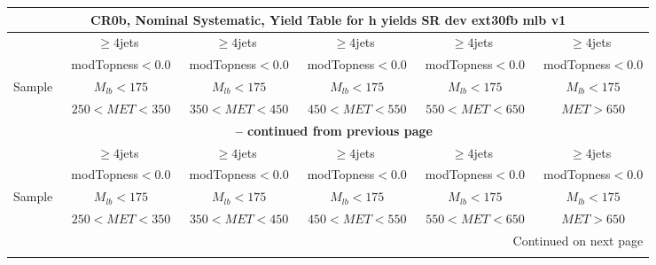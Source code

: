 \documentclass{article}
\begin{document}
 
 
 
 
\pagebreak 

 
 
 
 
\begin{longtable}{|l|c|c|c|c|c|} 
 
\multicolumn{6}{c}{ CR0b, Nominal Systematic, Yield Table for h yields SR dev ext30fb mlb v1 }\\* \hline 
  & $\ge4$jets  & $\ge4$jets  & $\ge4$jets  & $\ge4$jets  & $\ge4$jets \\* 
  & ~modTopness$<0.0$  & ~modTopness$<0.0$  & ~modTopness$<0.0$  & ~modTopness$<0.0$  & ~modTopness$<0.0$ \\* 
Sample  & ~$M_{lb}<175$  & ~$M_{lb}<175$  & ~$M_{lb}<175$  & ~$M_{lb}<175$  & ~$M_{lb}<175$ \\* 
  & ~$250<MET<350$  & ~$350<MET<450$  & ~$450<MET<550$  & ~$550<MET<650$  & ~$MET>650$ \\* 
\hline \hline 
\endfirsthead 
 
\multicolumn{6}{c}{{\bfseries \tablename\ \thetable{} -- continued from previous page}}\\* \hline 
  & $\ge4$jets  & $\ge4$jets  & $\ge4$jets  & $\ge4$jets  & $\ge4$jets \\* 
  & ~modTopness$<0.0$  & ~modTopness$<0.0$  & ~modTopness$<0.0$  & ~modTopness$<0.0$  & ~modTopness$<0.0$ \\* 
Sample  & ~$M_{lb}<175$  & ~$M_{lb}<175$  & ~$M_{lb}<175$  & ~$M_{lb}<175$  & ~$M_{lb}<175$ \\* 
  & ~$250<MET<350$  & ~$350<MET<450$  & ~$450<MET<550$  & ~$550<MET<650$  & ~$MET>650$ \\* 
\hline \hline 
\endhead 
 
\multicolumn{6}{|r|}{{Continued on next page}}\\* \hline 
\endfoot 
 
 
\endlastfoot 
 

\end{longtable}
\end{document}
